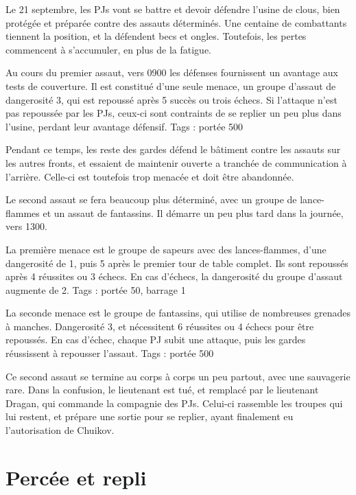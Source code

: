 \documentclass{report}
\begin{document}
\begin{multicols}{2}
Le 21 septembre, les PJs vont se battre et devoir défendre l'usine de clous, bien protégée et préparée contre des assauts déterminés. Une centaine de combattants tiennent la position, et la défendent becs et ongles. Toutefois, les pertes commencent à s'accumuler, en plus de la fatigue.

Au cours du premier assaut, vers 0900 les défenses fournissent un avantage aux tests de couverture. Il est constitué d'une seule menace, un groupe d'assaut de dangerosité 3, qui est repoussé après 5 succès ou trois échecs. Si l'attaque n'est pas repoussée par les PJs, ceux-ci sont contraints de se replier un peu plus dans l'usine, perdant leur avantage défensif. Tags : portée 500

Pendant ce temps, les reste des gardes défend le bâtiment contre les assauts sur les autres fronts, et essaient de maintenir ouverte a tranchée de communication à l'arrière. Celle-ci est toutefois trop menacée et doit être abandonnée.


Le second assaut se fera beaucoup plus déterminé, avec un groupe de lance-flammes et un assaut de fantassins. Il démarre un peu plus tard dans la journée, vers 1300.

La première menace est le groupe de sapeurs avec des lances-flammes, d'une dangerosité de 1, puis 5 après le premier tour de table complet. Ils sont repoussés après 4 réussites ou 3 échecs. En cas d'échecs, la dangerosité du groupe d'assaut augmente de 2. Tags : portée 50, barrage 1

La seconde menace est le groupe de fantassins, qui utilise de nombreuses grenades à manches. Dangerosité 3, et nécessitent 6 réussites ou 4 échecs pour être repoussés. En cas d'échec, chaque PJ subit une attaque, puis les gardes réussissent à repousser l'assaut. Tags : portée 500

Ce second assaut se termine au corps à corps un peu partout, avec une sauvagerie rare. Dans la confusion, le lieutenant est tué, et remplacé par le lieutenant Dragan, qui commande la compagnie des PJs. Celui-ci rassemble les troupes qui lui restent, et prépare une sortie pour se replier, ayant finalement eu l'autorisation de Chuikov.
\section{Percée et repli}


\end{multicols}
\end{document}
